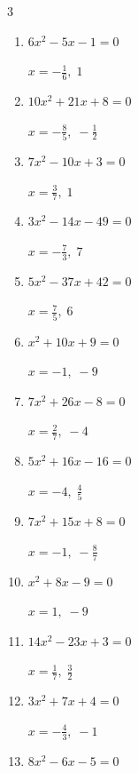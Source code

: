 \begin{multicols}{3}
\begin{enumerate}
        $\displaystyle x=-3,\; \frac{3}{2}$

  \item $6x^{2}-5x-1=0$

        $\displaystyle x=-\frac{1}{6},\; 1$

\columnbreak %

  \item $10x^{2}+21x+8=0$

        $\displaystyle x=-\frac{8}{5},\; -\frac{1}{2}$

  \item $7x^{2}-10x+3=0$

        $\displaystyle x=\frac{3}{7},\; 1$

  \item $3x^{2}-14x-49=0$

        $\displaystyle x=-\frac{7}{3},\; 7$

  \item $5x^{2}-37x+42=0$

        $\displaystyle x=\frac{7}{5},\; 6$

  \item $x^{2}+10x+9=0$

        $\displaystyle x=-1,\; -9$

  \item $7x^{2}+26x-8=0$

        $\displaystyle x=\frac{2}{7},\; -4$

  \item $5x^{2}+16x-16=0$

        $\displaystyle x=-4,\; \frac{4}{5}$

  \item $7x^{2}+15x+8=0$

        $\displaystyle x=-1,\; -\frac{8}{7}$

  \item $x^{2}+8x-9=0$

        $\displaystyle x=1,\; -9$

  \item $14x^{2}-23x+3=0$

        $\displaystyle x=\frac{1}{7},\; \frac{3}{2}$

\columnbreak %

  \item $3x^{2}+7x+4=0$

        $\displaystyle x=-\frac{4}{3},\; -1$

  \item $8x^{2}-6x-5=0$


\end{enumerate}
\end{multicols}
